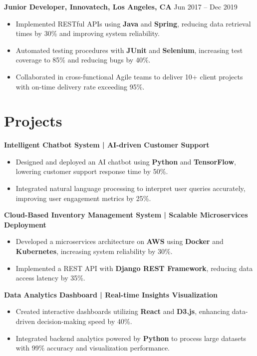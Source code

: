 \documentclass[a4paper,10pt]{article}
\begin{document}
\vspace{0.05in}

\textbf{Junior Developer, Innovatech, Los Angeles, CA} \hfill Jun 2017 -- Dec 2019
\begin{itemize}
    \item Implemented RESTful APIs using \textbf{Java} and \textbf{Spring}, reducing data retrieval times by 30\% and improving system reliability.
    \item Automated testing procedures with \textbf{JUnit} and \textbf{Selenium}, increasing test coverage to 85\% and reducing bugs by 40\%.
    \item Collaborated in cross-functional Agile teams to deliver 10+ client projects with on-time delivery rate exceeding 95\%.
\end{itemize}

\vspace{0.1in}

\section*{Projects}

\textbf{Intelligent Chatbot System | AI-driven Customer Support}
\begin{itemize}
    \item Designed and deployed an AI chatbot using \textbf{Python} and \textbf{TensorFlow}, lowering customer support response time by 50\%.
    \item Integrated natural language processing to interpret user queries accurately, improving user engagement metrics by 25\%.
\end{itemize}

\vspace{0.05in}

\textbf{Cloud-Based Inventory Management System | Scalable Microservices Deployment}
\begin{itemize}
    \item Developed a microservices architecture on \textbf{AWS} using \textbf{Docker} and \textbf{Kubernetes}, increasing system reliability by 30\%.
    \item Implemented a REST API with \textbf{Django REST Framework}, reducing data access latency by 35\%.
\end{itemize}

\vspace{0.05in}

\textbf{Data Analytics Dashboard | Real-time Insights Visualization}
\begin{itemize}
    \item Created interactive dashboards utilizing \textbf{React} and \textbf{D3.js}, enhancing data-driven decision-making speed by 40\%.
    \item Integrated backend analytics powered by \textbf{Python} to process large datasets with 99\% accuracy and visualization performance.
\end{itemize}
\end{document}
